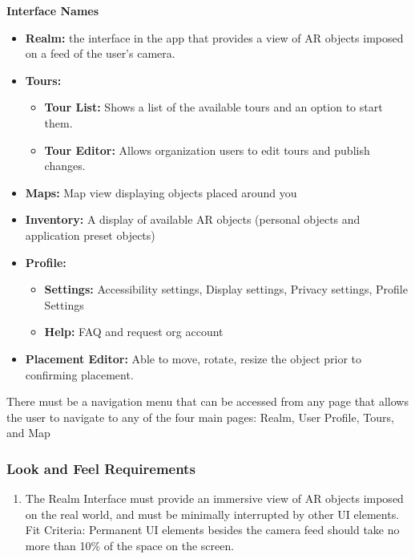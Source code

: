 \documentclass{article}
\begin{document}
\textbf{Interface Names}
\begin{itemize}
    \item \textbf{Realm:} the interface in the app that provides a view of AR objects imposed on a feed of the user’s camera.
    \item \textbf{Tours:}
          \begin{itemize}
              \item \textbf{Tour List:} Shows a list of the available tours and an option to start them.
              \item \textbf{Tour Editor:} Allows organization users to edit tours and publish changes.
          \end{itemize}
    \item \textbf{Maps:} Map view displaying objects placed around you
    \item \textbf{Inventory:} A display of available AR objects (personal objects and application preset objects)
    \item \textbf{Profile:}
          \begin{itemize}
              \item \textbf{Settings:} Accessibility settings, Display settings, Privacy settings, Profile Settings
              \item \textbf{Help:} FAQ and request org account
          \end{itemize}
    \item \textbf{Placement Editor:} Able to move, rotate, resize the object prior to confirming placement.
\end{itemize}

There must be a navigation menu that can be accessed from any page that allows the user to navigate to any of the four main pages: Realm, User Profile, Tours, and Map

\subsubsection{Look and Feel Requirements}



\begin{enumerate}[align=left, label=\textbf{EI-LF\arabic*:}]
    \item The Realm Interface must provide an immersive view of AR objects imposed on the real world, and must be minimally interrupted by other UI elements. \\
          Fit Criteria: Permanent UI elements besides the camera feed should take no more than 10\% of the space on the screen. \\

\end{enumerate}
\end{document}
